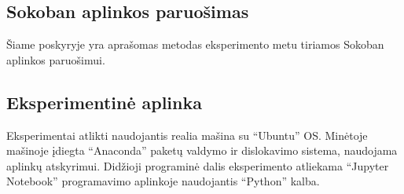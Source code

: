 \documentclass{VUMIFPSbakalaurinis}
\begin{document}
\subsection{Sokoban aplinkos paruošimas}
{
	Šiame poskyryje yra aprašomas metodas eksperimento metu tiriamos Sokoban aplinkos paruošimui.
}
\subsubsection{}


\subsection{Eksperimentinė aplinka}
{
	Eksperimentai atlikti naudojantis realia mašina su \enquote{Ubuntu} OS. Minėtoje mašinoje įdiegta \enquote{Anaconda} paketų valdymo ir dislokavimo sistema, naudojama aplinkų atskyrimui. Didžioji programinė dalis eksperimento atliekama \enquote{Jupyter Notebook} programavimo aplinkoje naudojantis \enquote{Python} kalba.
}
\end{document}
